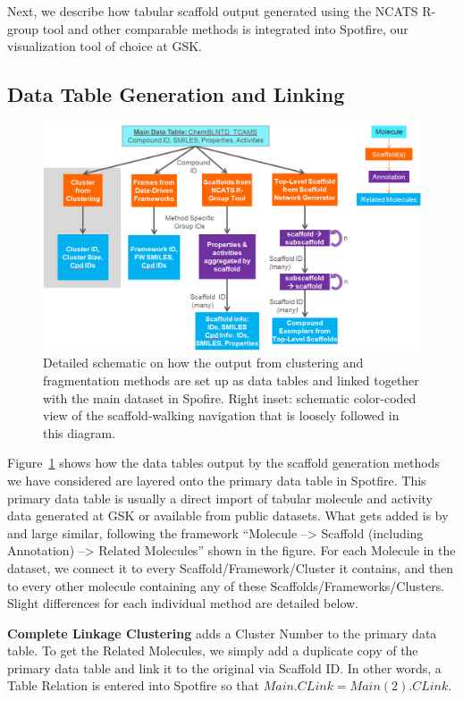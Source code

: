 \documentclass[journal=jacsat,manuscript=article]{achemso}
\newcommand*\fref[1]{Figure~\ref{fig:#1}}
\begin{document}
Next, we describe how tabular scaffold output generated using the NCATS R-group tool and other comparable methods is integrated into Spotfire, our visualization tool of choice at GSK.

\subsection{Data Table Generation and Linking}

\begin{figure}
\includegraphics[width=6in]{fig/details_all2.png}
\caption{Detailed schematic on how the output from clustering and fragmentation methods are set up as data tables and linked together with the main dataset in Spofire. Right inset: schematic color-coded view of the scaffold-walking navigation that is loosely followed in this diagram.}
\label{fig:detaildevil}
\end{figure}

\fref{detaildevil} shows how the data tables output by the scaffold generation methods we have considered are layered onto the primary data table in Spotfire. This primary data table is usually a direct import of tabular molecule and activity data generated at GSK or available from public datasets. What gets added is by and large similar, following the framework ``Molecule --> Scaffold (including Annotation) --> Related Molecules'' shown in the figure. For each Molecule in the dataset, we connect it to every Scaffold/Framework/Cluster it contains, and then to every other molecule containing any of these Scaffolds/Frameworks/Clusters. Slight differences for each individual method are detailed below. 

{\bf Complete Linkage Clustering} adds a Cluster Number to the primary data table. To get the Related Molecules, we simply add a duplicate copy of the primary data table and link it to the original via Scaffold ID. In other words, a Table Relation is entered into Spotfire so that $Main.CLink = Main(2).CLink$.  
\end{document}
